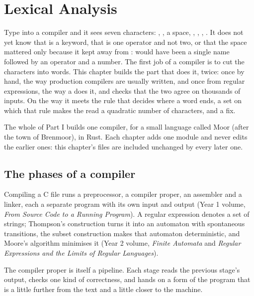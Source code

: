 \chapter{Lexical Analysis}\label{ch:b3:lexical-analysis}

Type  into a compiler and it sees seven characters: , , a space, , \code{<}, \code{=}, . It does not yet know that  is a keyword, that \code{<=} is one operator and not two, or that the space mattered only because it kept  away from :  would have been a single name followed by an operator and a number. The first job of a compiler is to cut the characters into words. This chapter builds the part that does it, twice: once by hand, the way production compilers are usually written, and once from regular expressions, the way a  does it, and checks that the two agree on thousands of inputs. On the way it meets the rule that decides where a word ends, a  set on which that rule makes the  read a quadratic number of characters, and a fix.

The whole of Part I builds one compiler, for a small language called Moor (after the town of Brenmoor), in Rust. Each chapter adds one module and never edits the earlier ones: this chapter's files are included unchanged by every later one.

\section{The phases of a compiler}\label{sec:b3:lexical-analysis:phases}

\begin{recall}
Compiling a C file runs a preprocessor, a compiler proper, an assembler and a linker, each a separate program with its own input and output (Year 1 volume, \emph{From Source Code to a Running Program}). A regular expression denotes a set of strings; Thompson's construction turns it into an automaton with spontaneous transitions, the subset construction makes that automaton deterministic, and Moore's algorithm minimises it (Year 2 volume, \emph{Finite Automata} and \emph{Regular Expressions and the Limits of Regular Languages}).
\end{recall}

The compiler proper is itself a pipeline. Each stage reads the previous stage's output, checks one kind of correctness, and hands on a form of the program that is a little further from the text and a little closer to the machine.

